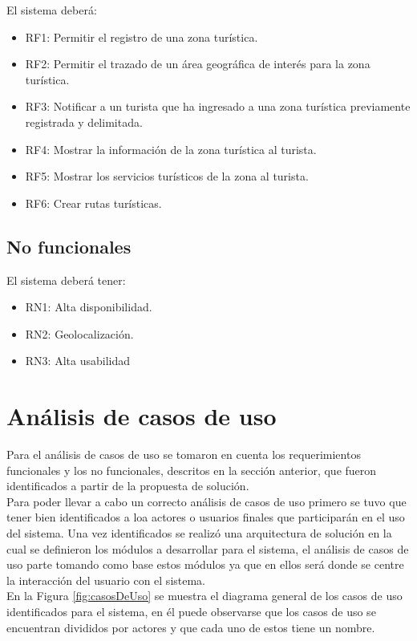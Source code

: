 El sistema deberá:

\begin{itemize}
	\item RF1: Permitir el registro de una zona turística.
	\item RF2: Permitir el trazado de un área geográfica de interés para la zona turística.
	\item RF3: Notificar a un turista que ha ingresado a una zona turística previamente registrada y delimitada.
	\item RF4: Mostrar la información de la zona turística al turista.
	\item RF5: Mostrar los servicios turísticos de la zona al turista.
	\item RF6: Crear rutas turísticas.
\end{itemize}

\hypertarget{cv:noFuncionales}{\subsection{No funcionales}}

El sistema deberá tener: 

\begin{itemize}
	\item RN1: Alta disponibilidad.
	\item RN2: Geolocalización.
	\item RN3: Alta usabilidad
\end{itemize}

\section{Análisis de casos de uso}
Para el análisis de casos de uso se tomaron en cuenta los requerimientos funcionales y los no funcionales, descritos en la sección anterior, que fueron identificados a partir de la propuesta de solución. \\

Para poder llevar a cabo un correcto análisis de casos de uso primero se tuvo que tener bien identificados a loa actores o usuarios finales que participarán en el uso del sistema. Una vez identificados se realizó una arquitectura de solución en la cual se definieron los módulos a desarrollar para el sistema, el análisis de casos de uso parte tomando como base estos módulos ya que en ellos será donde se centre la interacción del usuario con el sistema. \\

En la Figura \ref{fig:casosDeUso} se muestra el diagrama general de los casos de uso identificados para el sistema, en él puede observarse que los casos de uso se encuentran divididos por actores y que cada uno de estos tiene un nombre.



